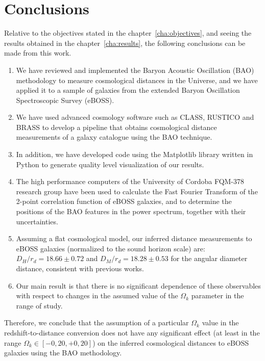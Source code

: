 \setcounter{chapter}{4}
\chapter{Conclusions}

Relative to the objectives stated in the chapter~\ref{cha:objectives}, and seeing the results obtained in the chapter~\ref{cha:results}, the following conclusions can be made from this work.

\begin{enumerate}
	\item We have reviewed and implemented the Baryon Acoustic Oscillation (BAO) methodology to measure cosmological distances in the Universe, and we have applied it to a sample of galaxies from the extended Baryon Oscillation Spectroscopic Survey (eBOSS).
	\item We have used advanced cosmology software such as CLASS, RUSTICO and BRASS to develop a pipeline that obtains cosmological distance measurements of a galaxy catalogue using the BAO technique.
	\item In addition, we have developed code using the Matplotlib library written in Python to generate quality level visualization of our results.
	\item The high performance computers of the University of Cordoba FQM-378 research group have been used to calculate the Fast Fourier Transform of the 2-point correlation function of eBOSS galaxies, and to determine the positions of the BAO features in the power spectrum, together with their uncertainties.
	\item Assuming a flat cosmological model, our inferred distance measurements to eBOSS galaxies (normalized to the sound horizon scale) are: $D_H/r_d = 18.66 \pm 0.72$ and $D_M/r_d = 18.28 \pm 0.53$ for the angular diameter distance, consistent with previous works.
	\item Our main result is that there is no significant dependence of these observables with respect to changes in the assumed value of the $\Omega_k$ parameter in the range of study.
\end{enumerate}

Therefore, we conclude that the assumption of a particular $\Omega_k$ value in the redshift-to-distance conversion does not have any significant effect (at least in the range $\Omega_k \in [-0,20, +0,20]$) on the inferred cosmological distances to eBOSS galaxies using the BAO methodology.

